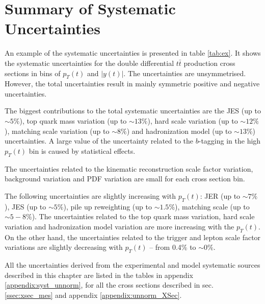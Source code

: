 \section{Summary of Systematic Uncertainties}

An example of the systematic uncertainties is presented in table \ref{tab:ex}. It shows the 
systematic uncertainties for the double differential $t\bar{t}$ production cross sections in bins of $p_{T}(t)$ and $|y(t)|$.
The uncertainties are unsymmetrised. However, the total uncertainties result in mainly symmetric positive and negative uncertainties.

The biggest contributions to the total systematic uncertainties are the JES (up to $\sim 5\%$), top quark mass variation (up to
$\sim 13\%$), hard scale variation (up to $\sim 12\%$), matching scale variation (up to $\sim 8\%$) and hadronization model
(up to $\sim 13\%$) uncertainties. A large value of the uncertainty related to the $b$-tagging in the high $p_{T}(t)$ bin 
is caused by statistical effects.

The uncertainties related to the kinematic reconstruction scale factor variation, background variation and PDF variation are 
small for each cross section bin.

The following uncertainties are slightly increasing with $p_{T}(t)$: JER (up to $\sim 7\%$), JES (up to $\sim 5\%$), pile up
reweighting (up to $\sim 1.5\%$), matching scale (up to $\sim 5-8\%$). The uncertainties related to the top quark mass variation,
hard scale variation and hadronization model variation are more increasing with the $p_{T}(t)$. On the other hand, the uncertainties
related to the trigger and lepton scale factor variations are slightly decreasing with $p_{T}(t)$ -- from 0.4\% to $\sim0\%$.



All the uncertainties derived from the experimental and model systematic sources described in this chapter are listed in the tables in appendix \ref{appendix:syst_unnorm},
for all the cross sections described in sec. \ref{ssec:xsec_mes} and appendix \ref{appendix:unnorm_XSec}. 
% 
% 

